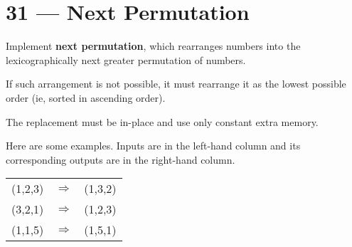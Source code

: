 \section{31 --- Next Permutation}
Implement \textbf{next permutation}, which rearranges numbers into the lexicographically next greater permutation of numbers.
\par
If such arrangement is not possible, it must rearrange it as the lowest possible order (ie, sorted in ascending order).
\par
The replacement must be in-place and use only constant extra memory.
\par
Here are some examples. Inputs are in the left-hand column and its corresponding outputs are in the right-hand column.
\begin{table}[H]
\begin{tabular}{lcl}
(1,2,3) & $\Longrightarrow$ & (1,3,2) \\
(3,2,1) & $\Longrightarrow$ & (1,2,3) \\
(1,1,5) & $\Longrightarrow$ & (1,5,1)
\end{tabular}
\end{table}
